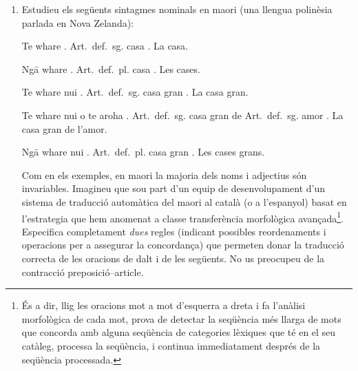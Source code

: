 \begin{enumerate}
\item 
    Estudieu els següents sintagmes nominals en maori (una
     llengua polinèsia parlada en Nova Zelanda):

     \begin{example}
     \gll Te whare .
          \textsf{Art.\ def.\ sg.} casa .
     \glt La casa.
     \glend
     \end{example}

     \begin{example}
     \gll Ng\={a} whare  .
          \textsf{Art.\ def.\ pl.} casa .
     \glt Les cases.
     \glend
     \end{example}

     \begin{example}
     \gll Te whare nui .
          \textsf{Art.\ def.\ sg.} casa gran .
     \glt La casa gran.
     \glend
     \end{example}

     \begin{example}
     \gll Te whare nui o te aroha .
          \textsf{Art.\ def.\ sg.} casa gran de \textsf{Art.\ def.\
          sg.} amor .
     \glt La casa gran de l'amor.
     \glend
     \end{example}

     \begin{example}
     \gll Ng\={a} whare nui . 
          \textsf{Art.\ def.\ pl.} casa gran .
     \glt Les cases grans.
     \glend
     \end{example}
     
     Com en els exemples, en maori la majoria dels noms i adjectius
     són invariables.  Imagineu que sou part d'un equip de
     desenvolupament d'un sistema de traducció automàtica del maori al
     català (o a l'espanyol) basat en l'estrategia que hem anomenat a
     classe transferència morfològica avançada\footnote{És a dir, llig
       les oracions mot a mot d'esquerra a dreta i fa l'anàlisi
       morfològica de cada mot, prova de detectar la seqüència més
       llarga de mots que concorda amb alguna seqüència de categories
       lèxiques que té en el seu catàleg, processa la seqüència, i
       continua immediatament després de la seqüència processada.}.
     Especifica completament \emph{dues} regles (indicant possibles
     reordenaments i operacions per a assegurar la concordança) que
     permeten donar la traducció correcta de les oracions de dalt i de
     les següents.  No us preocupeu de la contracció
     preposició--article.


\end{enumerate}
